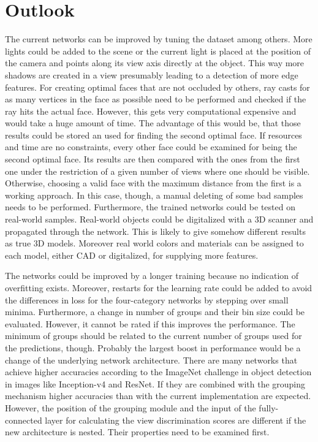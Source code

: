 \section{Outlook}
\label{sec:discussion-outlook}
The current networks can be improved by tuning the dataset among others.
More lights could be added to the scene or the current light is placed at the position of the camera and points along its view axis directly at the object.
This way more shadows are created in a view presumably leading to a detection of more edge features.
For creating optimal faces that are not occluded by others, ray casts for as many vertices in the face as possible need to be performed and checked if the ray hits the actual face.
However, this gets very computational expensive and would take a huge amount of time.
The advantage of this would be, that those results could be stored an used for finding the second optimal face.
If resources and time are no constraints, every other face could be examined for being the second optimal face.
Its results are then compared with the ones from the first one under the restriction of a given number of views where one should be visible.
Otherwise, choosing a valid face with the maximum distance from the first is a working approach.
In this case, though, a manual deleting of some bad samples needs to be performed.
Furthermore, the trained networks could be tested on real-world samples.
Real-world objects could be digitalized with a 3D scanner and propagated through the network.
This is likely to give somehow different results as true 3D models.
Moreover real world colors and materials can be assigned to each model, either CAD or digitalized, for supplying more features.

The networks could be improved by a longer training because no indication of overfitting exists.
Moreover, restarts for the learning rate could be added to avoid the differences in loss for the four-category networks by stepping over small minima.
Furthermore, a change in number of groups and their bin size could be evaluated.
However, it cannot be rated if this improves the performance.
The minimum of groups should be related to the current number of groups used for the predictions, though.
Probably the largest boost in performance would be a change of the underlying network architecture.
There are many networks that achieve higher accuracies according to the ImageNet challenge in object detection in images like Inception-v4 and ResNet.
If they are combined with the grouping mechanism higher accuracies than with the current implementation are expected.
However, the position of the grouping module and the input of the fully-connected layer for calculating the view discrimination scores are different if the new architecture is nested.
Their properties need to be examined first.